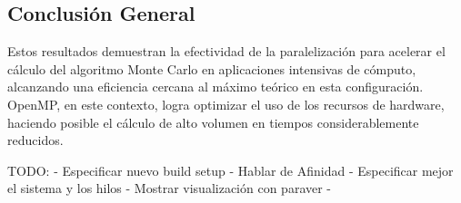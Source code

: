 \documentclass[a4paper, 10pt, onecolumn]{IEEEtran}
\begin{document}
\subsection{Conclusión General}

Estos resultados demuestran la efectividad de la paralelización para acelerar el cálculo del algoritmo Monte Carlo en aplicaciones intensivas de cómputo, alcanzando una eficiencia cercana al máximo teórico en esta configuración. OpenMP, en este contexto, logra optimizar el uso de los recursos de hardware, haciendo posible el cálculo de alto volumen en tiempos considerablemente reducidos.

TODO: 
 - Especificar nuevo build setup
 - Hablar de Afinidad
 - Especificar mejor el sistema y los hilos
 - Mostrar visualización con paraver
 - 
\end{document}
